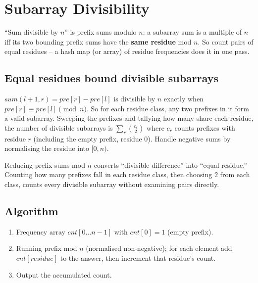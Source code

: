 \section{Subarray Divisibility}
\label{sec:cses-subarray-divisibility}


\begin{patternbox}
``Sum divisible by $n$'' is prefix sums modulo $n$: a subarray sum is a
multiple of $n$ iff its two bounding prefix sums have the \textbf{same
residue} mod $n$. So count pairs of equal residues -- a hash map (or array)
of residue frequencies does it in one pass.
\end{patternbox}

\subsection*{Equal residues bound divisible subarrays}

$\textit{sum}(l+1,r)=\textit{pre}[r]-\textit{pre}[l]$ is divisible by $n$
exactly when $\textit{pre}[r]\equiv\textit{pre}[l]\pmod n$. So for each
residue class, any two prefixes in it form a valid subarray. Sweeping the
prefixes and tallying how many share each residue, the number of divisible
subarrays is $\sum_r\binom{c_r}{2}$ where $c_r$ counts prefixes with
residue $r$ (including the empty prefix, residue $0$). Handle negative sums
by normalising the residue into $[0,n)$.

\begin{ideabox}
Reducing prefix sums mod $n$ converts ``divisible difference'' into ``equal
residue.'' Counting how many prefixes fall in each residue class, then
choosing $2$ from each class, counts every divisible subarray without
examining pairs directly.
\end{ideabox}

\subsection*{Algorithm}

\begin{enumerate}
  \item Frequency array $\textit{cnt}[0\ldots n-1]$ with
        $\textit{cnt}[0]=1$ (empty prefix).
  \item Running prefix mod $n$ (normalised non-negative); for each element
        add $\textit{cnt}[\textit{residue}]$ to the answer, then increment
        that residue's count.
  \item Output the accumulated count.
\end{enumerate}

